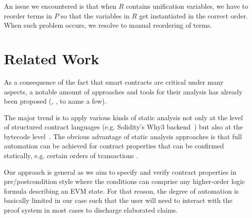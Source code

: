 \documentclass[sigplan,10pt,review]{acmart}\settopmatter{printfolios=true,printccs=false,printacmref=false}
\begin{document}
An issue we encountered is that when $R$ contains unification variables,
we have to reorder terms in $P$ so that the variables in $R$ get instantiated
in the correct order.
When such problem occurs, we resolve to manual reordering of terms.



\section{Related Work}
\label{sec:rwork}


As a consequence of the fact that smart contracts are critical under many aspects, a notable amount of
approaches and tools for their analysis has already been proposed 
(\cite{Bhargavan:2016:FVS:2993600.2993611}, \cite{securify}, \cite{openzeppelin} to name a few).
 
The major trend is to apply various kinds of static analysis not only at the level of structured contract
languages (e.g. Solidity's Why3 backend~\cite{filliatre2013why3}) but also at the bytecode level~\cite{Msuiche_17,securify}. 
%
The obvious advantage of static analysis approaches is that full automation can be achieved for 
contract properties that can be confirmed statically, e.g. certain orders of transactions \cite{securify}.
 
Our approach is general as we aim to specify and verify contract properties in pre/postcondition
style where the conditions can comprise any higher-order logic formula describing an EVM state. 
For that reason, the degree of automation is basically limited in our case such that the user will need to interact 
with the proof system in most cases to discharge elaborated claims. 
\end{document}
